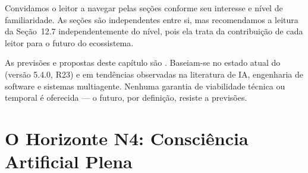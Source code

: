 \begin{table}[htb]
\centering
\caption{Visão geral dos problemas em aberto e rumos futuros}
\label{tab:visao-geral-futuro}
\small
\end{table}

\noindent Convidamos o leitor a navegar pelas seções conforme seu interesse
e nível de familiaridade. As seções são independentes entre si, mas
recomendamos a leitura da Seção~12.7 independentemente do nível, pois
ela trata da contribuição de cada leitor para o futuro do ecossistema.

\begin{observacao}
As previsões e propostas deste capítulo são . Baseiam-se no estado atual do \opencodeeco{} (versão 5.4.0,
R23) e em tendências observadas na literatura de IA, engenharia de
software e sistemas multiagente. Nenhuma garantia de viabilidade técnica
ou temporal é oferecida --- o futuro, por definição, resiste a previsões.
\end{observacao}

\section{O Horizonte N4: Consciência Artificial Plena}
\label{sec:horizonte-n4}
\nivelphd

